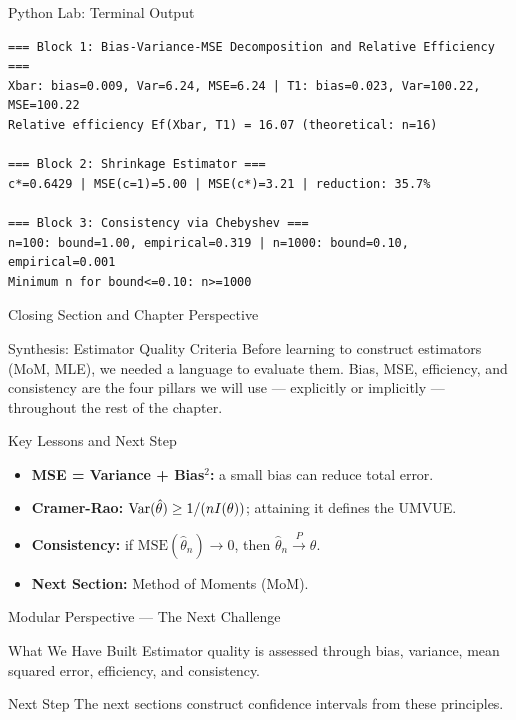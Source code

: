 \documentclass[aspectratio=169,xcolor={dvipsnames,table}]{beamer}
\begin{document}
\begin{frame}[fragile]{Python Lab: Terminal Output}
	\vspace{-0.1cm}
	\begin{block}{}
		\fontsize{4pt}{5pt}\selectfont
		\begin{verbatim}
=== Block 1: Bias-Variance-MSE Decomposition and Relative Efficiency ===
Xbar: bias=0.009, Var=6.24, MSE=6.24 | T1: bias=0.023, Var=100.22, MSE=100.22
Relative efficiency Ef(Xbar, T1) = 16.07 (theoretical: n=16)

=== Block 2: Shrinkage Estimator ===
c*=0.6429 | MSE(c=1)=5.00 | MSE(c*)=3.21 | reduction: 35.7%

=== Block 3: Consistency via Chebyshev ===
n=100: bound=1.00, empirical=0.319 | n=1000: bound=0.10, empirical=0.001
Minimum n for bound<=0.10: n>=1000
		\end{verbatim}
	\end{block}
\end{frame}


\begin{frame}{Closing Section and Chapter Perspective}
	\vspace{-0.2cm}
	\begin{block}{Synthesis: Estimator Quality Criteria}
		\scriptsize
		Before learning to construct estimators (MoM, MLE), we needed a language to evaluate them. Bias, MSE, efficiency, and consistency are the four pillars we will use --- explicitly or implicitly --- throughout the rest of the chapter.
	\end{block}
	\vspace{0.05cm}
	\pause
	\begin{alertblock}{Key Lessons and Next Step}
		\begin{itemize}\itemsep=0.05cm
			\item \textbf{MSE = Variance + Bias$^2$:} a small bias can reduce total error.
			\item \textbf{Cramer-Rao:} $\operatorname{Var}(\hat\theta) \ge 1/(nI(\theta))$; attaining it defines the UMVUE.
			\item \textbf{Consistency:} if $\text{MSE}(\hat\theta_n)\to 0$, then $\hat\theta_n \xrightarrow{P} \theta$.
			\item \textbf{Next Section:} \textcolor{TecRojo}{Method of Moments (MoM)}.
		\end{itemize}
	\end{alertblock}
\end{frame}

\begin{frame}{Modular Perspective --- The Next Challenge}
  \small
  \begin{block}{What We Have Built}
    Estimator quality is assessed through bias, variance, mean squared error, efficiency, and consistency.
  \end{block}
  \pause
  \begin{alertblock}{Next Step}
    The next sections construct confidence intervals from these principles.
  \end{alertblock}
\end{frame}
\end{document}
